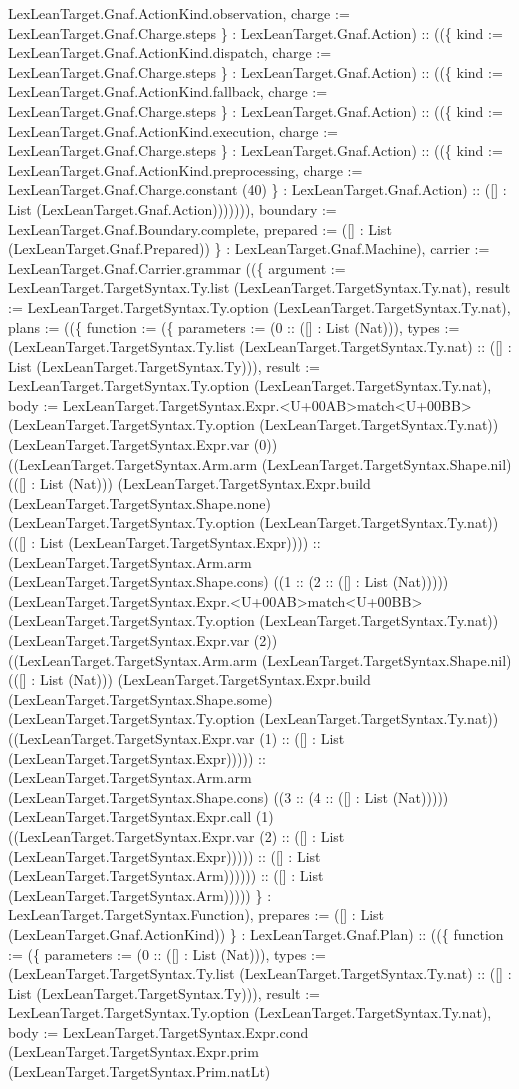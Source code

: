 \documentclass[11pt]{article}
\begin{document}
LexLeanTarget.Gnaf.ActionKind.observation, charge := LexLeanTarget.Gnaf.Charge.steps \} : LexLeanTarget.Gnaf.Action) :: ((\{ kind := LexLeanTarget.Gnaf.ActionKind.dispatch, charge := LexLeanTarget.Gnaf.Charge.steps \} : LexLeanTarget.Gnaf.Action) :: ((\{ kind := LexLeanTarget.Gnaf.ActionKind.fallback, charge := LexLeanTarget.Gnaf.Charge.steps \} : LexLeanTarget.Gnaf.Action) :: ((\{ kind := LexLeanTarget.Gnaf.ActionKind.execution, charge := LexLeanTarget.Gnaf.Charge.steps \} : LexLeanTarget.Gnaf.Action) :: ((\{ kind := LexLeanTarget.Gnaf.ActionKind.preprocessing, charge := LexLeanTarget.Gnaf.Charge.constant (40) \} : LexLeanTarget.Gnaf.Action) :: ([] : List (LexLeanTarget.Gnaf.Action))))))), boundary := LexLeanTarget.Gnaf.Boundary.complete, prepared := ([] : List (LexLeanTarget.Gnaf.Prepared)) \} : LexLeanTarget.Gnaf.Machine), carrier := LexLeanTarget.Gnaf.Carrier.grammar ((\{ argument := LexLeanTarget.TargetSyntax.Ty.list (LexLeanTarget.TargetSyntax.Ty.nat), result := LexLeanTarget.TargetSyntax.Ty.option (LexLeanTarget.TargetSyntax.Ty.nat), plans := ((\{ function := (\{ parameters := (0 :: ([] : List (Nat))), types := (LexLeanTarget.TargetSyntax.Ty.list (LexLeanTarget.TargetSyntax.Ty.nat) :: ([] : List (LexLeanTarget.TargetSyntax.Ty))), result := LexLeanTarget.TargetSyntax.Ty.option (LexLeanTarget.TargetSyntax.Ty.nat), body := LexLeanTarget.TargetSyntax.Expr.<U+00AB>match<U+00BB> (LexLeanTarget.TargetSyntax.Ty.option (LexLeanTarget.TargetSyntax.Ty.nat)) (LexLeanTarget.TargetSyntax.Expr.var (0)) ((LexLeanTarget.TargetSyntax.Arm.arm (LexLeanTarget.TargetSyntax.Shape.nil) (([] : List (Nat))) (LexLeanTarget.TargetSyntax.Expr.build (LexLeanTarget.TargetSyntax.Shape.none) (LexLeanTarget.TargetSyntax.Ty.option (LexLeanTarget.TargetSyntax.Ty.nat)) (([] : List (LexLeanTarget.TargetSyntax.Expr)))) :: (LexLeanTarget.TargetSyntax.Arm.arm (LexLeanTarget.TargetSyntax.Shape.cons) ((1 :: (2 :: ([] : List (Nat))))) (LexLeanTarget.TargetSyntax.Expr.<U+00AB>match<U+00BB> (LexLeanTarget.TargetSyntax.Ty.option (LexLeanTarget.TargetSyntax.Ty.nat)) (LexLeanTarget.TargetSyntax.Expr.var (2)) ((LexLeanTarget.TargetSyntax.Arm.arm (LexLeanTarget.TargetSyntax.Shape.nil) (([] : List (Nat))) (LexLeanTarget.TargetSyntax.Expr.build (LexLeanTarget.TargetSyntax.Shape.some) (LexLeanTarget.TargetSyntax.Ty.option (LexLeanTarget.TargetSyntax.Ty.nat)) ((LexLeanTarget.TargetSyntax.Expr.var (1) :: ([] : List (LexLeanTarget.TargetSyntax.Expr))))) :: (LexLeanTarget.TargetSyntax.Arm.arm (LexLeanTarget.TargetSyntax.Shape.cons) ((3 :: (4 :: ([] : List (Nat))))) (LexLeanTarget.TargetSyntax.Expr.call (1) ((LexLeanTarget.TargetSyntax.Expr.var (2) :: ([] : List (LexLeanTarget.TargetSyntax.Expr))))) :: ([] : List (LexLeanTarget.TargetSyntax.Arm)))))) :: ([] : List (LexLeanTarget.TargetSyntax.Arm))))) \} : LexLeanTarget.TargetSyntax.Function), prepares := ([] : List (LexLeanTarget.Gnaf.ActionKind)) \} : LexLeanTarget.Gnaf.Plan) :: ((\{ function := (\{ parameters := (0 :: ([] : List (Nat))), types := (LexLeanTarget.TargetSyntax.Ty.list (LexLeanTarget.TargetSyntax.Ty.nat) :: ([] : List (LexLeanTarget.TargetSyntax.Ty))), result := LexLeanTarget.TargetSyntax.Ty.option (LexLeanTarget.TargetSyntax.Ty.nat), body := LexLeanTarget.TargetSyntax.Expr.cond (LexLeanTarget.TargetSyntax.Expr.prim (LexLeanTarget.TargetSyntax.Prim.natLt) 
\end{document}
